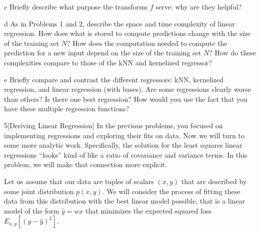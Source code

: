 \documentclass[expanded]{lkx_pset}
\begin{document}
\begin{parts}
  \begin{part}{c}
    Briefly describe what purpose the transforms $f$ serve: why are they helpful?
  \end{part}

  \begin{part}{d}
    As in Problems 1 and 2, describe the space and time complexity of linear regression.  How does what is stored to compute predictions change with the size of the training set $N$?  How does the computation needed to compute the prediction for a new input depend on the size of the training set $N$?  How do these complexities compare to those of the kNN and kernelized regressor?
  \end{part}

  \begin{part}{e}
    Briefly compare and contrast the different regressors: kNN,
    kernelized regression, and linear regression (with bases).  Are some
    regressions clearly worse than others?  Is there one best
    regression?  How would you use the fact that you have these multiple
    regression functions?
  \end{part}

\end{parts}

\begin{problem}{5}[Deriving Linear Regression]
  In the previous problems, you focused on implementing regressions
  and exploring their fits on data. Now we will turn to some more
  analytic work.  Specifically, the solution for the least squares
  linear regressions ``looks'' kind of like a ratio of covariance and
  variance terms.  In this problem, we will make that connection more
  explicit.

  \medskip
  Let us assume that our data are tuples of scalars $(x,y)$ that are
  described by some joint distribution $p(x,y)$. We will consider the process of fitting these data from this distribution with the best linear model
  possible, that is a linear model of the form $\hat{y} = wx$ that
  minimizes the expected squared loss $E_{x,y}[ ( y - \hat{y} )^2
  ]$.
\end{problem}
  
\end{document}
